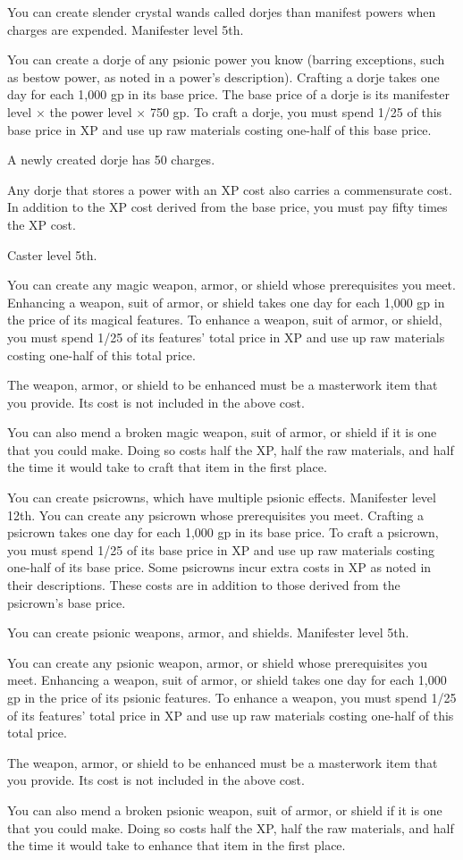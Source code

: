 {You can create slender crystal wands called dorjes than manifest powers when charges are expended.}
{Manifester level 5th.}
{You can create a dorje of any psionic power you know (barring exceptions, such as bestow power, as noted in a power's description). Crafting a dorje takes one day for each 1,000 gp in its base price. The base price of a dorje is its manifester level $\times$ the power level $\times$ 750 gp. To craft a dorje, you must spend 1/25 of this base price in XP and use up raw materials costing one-half of this base price.

A newly created dorje has 50 charges.

Any dorje that stores a power with an XP cost also carries a commensurate cost. In addition to the XP cost derived from the base price, you must pay fifty times the XP cost.}{}{}

{Caster level 5th.}
{You can create any magic weapon, armor, or shield whose prerequisites you meet. Enhancing a weapon, suit of armor, or shield takes one day for each 1,000 gp in the price of its magical features. To enhance a weapon, suit of armor, or shield, you must spend 1/25 of its features' total price in XP and use up raw materials costing one-half of this total price.

The weapon, armor, or shield to be enhanced must be a masterwork item that you provide. Its cost is not included in the above cost.

You can also mend a broken magic weapon, suit of armor, or shield if it is one that you could make. Doing so costs half the XP, half the raw materials, and half the time it would take to craft that item in the first place.}

{You can create psicrowns, which have multiple psionic effects.}
{Manifester level 12th.}
{You can create any psicrown whose prerequisites you meet. Crafting a psicrown takes one day for each 1,000 gp in its base price. To craft a psicrown, you must spend 1/25 of its base price in XP and use up raw materials costing one-half of its base price. Some psicrowns incur extra costs in XP as noted in their descriptions. These costs are in addition to those derived from the psicrown's base price.}{}{}

{You can create psionic weapons, armor, and shields.}
{Manifester level 5th.}
{You can create any psionic weapon, armor, or shield whose prerequisites you meet. Enhancing a weapon, suit of armor, or shield takes one day for each 1,000 gp in the price of its psionic features. To enhance a weapon, you must spend 1/25 of its features' total price in XP and use up raw materials costing one-half of this total price.

The weapon, armor, or shield to be enhanced must be a masterwork item that you provide. Its cost is not included in the above cost.

You can also mend a broken psionic weapon, suit of armor, or shield if it is one that you could make. Doing so costs half the XP, half the raw materials, and half the time it would take to enhance that item in the first place.}{}{}


